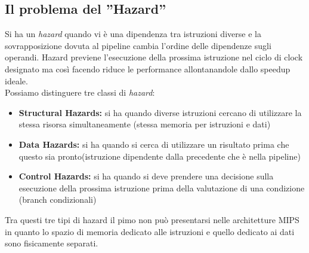\subsection{Il problema del ''Hazard''}
Si ha un \emph{hazard} quando vi è una dipendenza tra istruzioni diverse e la sovrapposizione dovuta al pipeline cambia l'ordine delle dipendenze sugli operandi. Hazard previene l'esecuzione della prossima istruzione nel ciclo di clock designato ma così facendo riduce le performance allontanandole dallo speedup ideale.\\
Possiamo distinguere tre classi di \emph{hazard}:
\begin{itemize}
\item \textbf{Structural Hazards:} si ha quando diverse istruzioni cercano di utilizzare la stessa risorsa simultaneamente (stessa memoria per istruzioni e dati)
\item \textbf{Data Hazards:} si ha quando si cerca di utilizzare un risultato prima che questo sia pronto(istruzione dipendente dalla precedente che è nella pipeline)
\item \textbf{Control Hazards:} si ha quando si deve prendere una decisione sulla esecuzione della prossima istruzione prima della valutazione di una condizione (branch condizionali)
\end{itemize}
Tra questi tre tipi di hazard il pimo non può presentarsi nelle architetture MIPS in quanto lo spazio di memoria dedicato alle istruzioni e quello dedicato ai dati sono fisicamente separati.
\pagebreak

